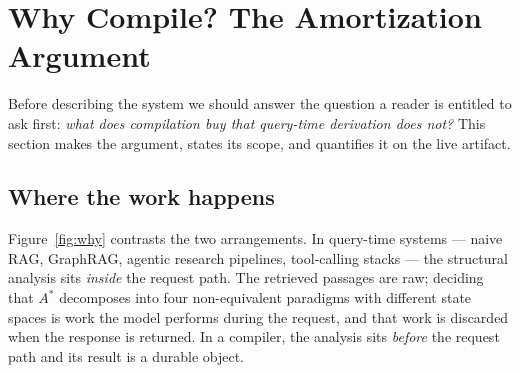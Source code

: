 \documentclass[10pt,a4paper]{article}
\begin{document}
\section{Why Compile? The Amortization Argument}
\label{sec:why}

Before describing the system we should answer the question a reader is entitled
to ask first: \emph{what does compilation buy that query-time derivation does
not?} This section makes the argument, states its scope, and quantifies it on
the live artifact.

\subsection{Where the work happens}

Figure~\ref{fig:why} contrasts the two arrangements. In query-time systems ---
naive RAG, GraphRAG, agentic research pipelines, tool-calling stacks --- the
structural analysis sits \emph{inside} the request path. The retrieved passages
are raw; deciding that $A^\ast$ decomposes into four non-equivalent paradigms
with different state spaces is work the model performs during the request, and
that work is discarded when the response is returned. In a compiler, the
analysis sits \emph{before} the request path and its result is a durable object.
\end{document}
